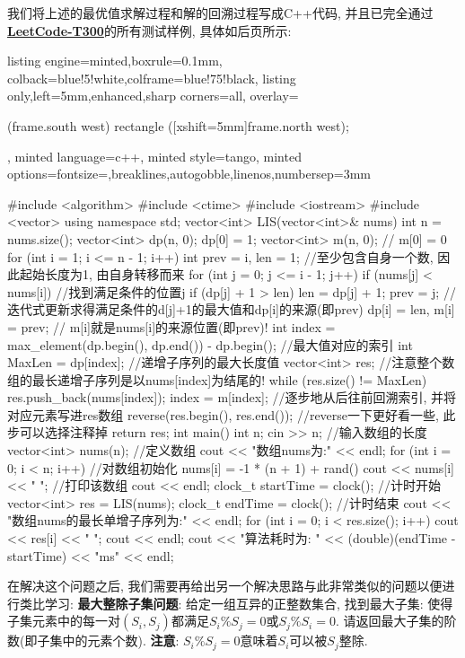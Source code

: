 \documentclass{article}
\begin{document}
\begin{homeworkProblem}
	我们将上述的最优值求解过程和解的回溯过程写成C++代码, 并且已完全通过\href{https://leetcode.cn/problems/longest-increasing-subsequence/description/}{\textbf{LeetCode-T300}}的所有测试样例, 具体如后页所示:
	\newpage
\begin{tcblisting}{listing engine=minted,boxrule=0.1mm,
colback=blue!5!white,colframe=blue!75!black,
listing only,left=5mm,enhanced,sharp corners=all,
overlay={\begin{tcbclipinterior} (frame.south west)
rectangle ([xshift=5mm]frame.north west);\end{tcbclipinterior}},
minted language=c++,
minted style=tango,
minted options={fontsize=\small,breaklines,autogobble,linenos,numbersep=3mm}}
#include <algorithm>
#include <ctime>
#include <iostream>
#include <vector>
using namespace std;
vector<int> LIS(vector<int>& nums) {
    int n = nums.size();
    vector<int> dp(n, 0);
    dp[0] = 1;
    vector<int> m(n, 0); // m[0] = 0
    for (int i = 1; i <= n - 1; i++) {
        int prev = i, len = 1; //至少包含自身一个数, 因此起始长度为1, 由自身转移而来
        for (int j = 0; j <= i - 1; j++) {
            if (nums[j] < nums[i]) { //找到满足条件的位置j
                if (dp[j] + 1 > len) {
                    len = dp[j] + 1;
                    prev = j; //迭代式更新求得满足条件的d[j]+1的最大值和dp[i]的来源(即prev)
                }
            }
        }
        dp[i] = len, m[i] = prev; // m[i]就是nums[i]的来源位置(即prev)!
    }
    int index = max_element(dp.begin(), dp.end()) - dp.begin(); //最大值对应的索引
    int MaxLen = dp[index]; //递增子序列的最大长度值
    vector<int> res; //注意整个数组的最长递增子序列是以nums[index]为结尾的!
    while (res.size() != MaxLen) {
        res.push_back(nums[index]);
        index = m[index]; //逐步地从后往前回溯索引, 并将对应元素写进res数组
    }
    reverse(res.begin(), res.end()); //reverse一下更好看一些, 此步可以选择注释掉
    return res;
}
int main() {
    int n;
    cin >> n;            //输入数组的长度
    vector<int> nums(n); //定义数组
    cout << "数组nums为:" << endl;
    for (int i = 0; i < n; i++) { //对数组初始化
        nums[i] = -1 * (n + 1) +
                  rand() %
        cout << nums[i] << " "; //打印该数组
    }
    cout << endl;
    clock_t startTime = clock(); //计时开始
    vector<int> res = LIS(nums);
    clock_t endTime = clock(); //计时结束
    cout << "数组nums的最长单增子序列为:" << endl;
    for (int i = 0; i < res.size(); i++) {
        cout << res[i] << " ";
    }
    cout << endl;
    cout << "算法耗时为: " << (double)(endTime - startTime) << "ms" << endl;
}
\end{tcblisting}
	在解决这个问题之后, 我们需要再给出另一个解决思路与此非常类似的问题以便进行类比学习: \textbf{最大整除子集问题}: 给定一组互异的正整数集合, 找到最大子集: 使得子集元素中的每一对$(S_i,S_j)$都满足$S_i\%S_j=0$或$S_j\% S_i=0$. 请返回最大子集的阶数(即子集中的元素个数). \textbf{注意}: $S_i\%S_j=0$意味着$S_i$可以被$S_j$整除.


\end{homeworkProblem}
\end{document}
